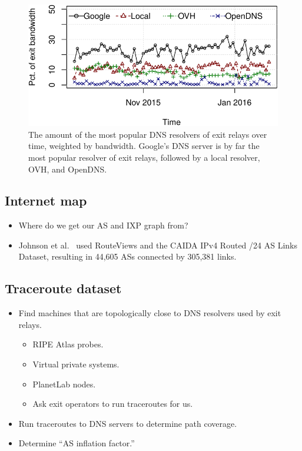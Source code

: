 \begin{figure}[t]
	\centering
	\includegraphics[width=\linewidth]{figures/exit-resolvers.pdf}
	\caption{The amount of the most popular DNS resolvers of exit relays over
	time, weighted by bandwidth.  Google's DNS server is by far the most popular
	resolver of exit relays, followed by a local resolver, OVH, and OpenDNS.}
	\label{fig:exit-resolvers}
\end{figure}


\subsection{Internet map}
\begin{itemize}
	\item Where do we get our AS and IXP graph from?
	\item Johnson et al.~\cite[\S 5.2]{Johnson2013a} used RouteViews and the CAIDA IPv4
		Routed /24 AS Links Dataset, resulting in 44,605 ASs connected by
		305,381 links.
\end{itemize}

\subsection{Traceroute dataset}
\label{sec:traceroute-dataset}
\begin{itemize}
	\item Find machines that are topologically close to DNS resolvers
		used by exit relays.
	\begin{itemize}
		\item RIPE Atlas probes.
		\item Virtual private systems.
		\item PlanetLab nodes.
		\item Ask exit operators to run traceroutes for us.
	\end{itemize}
	\item Run traceroutes to DNS servers to determine path coverage.
	\item Determine ``AS inflation factor.''
\end{itemize}

